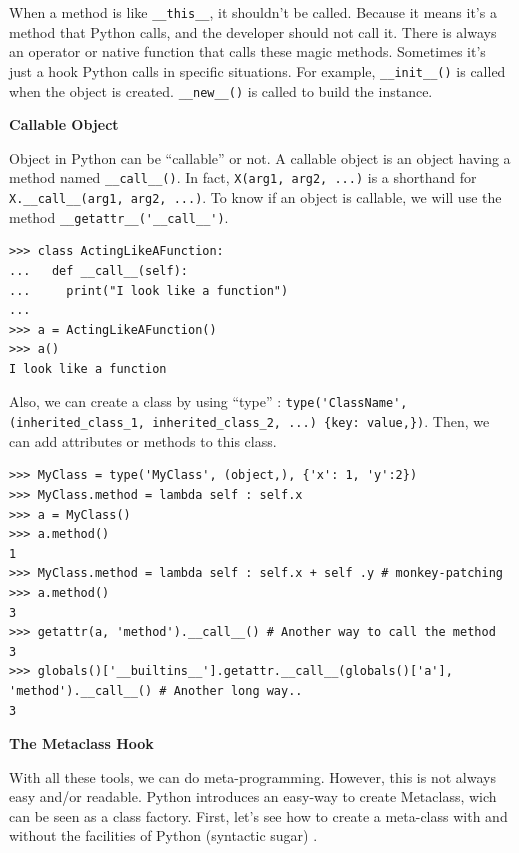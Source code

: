 \documentclass[a4paper,10pt]{article}
\begin{document}
When a method is like \lstinline|__this__|, it shouldn't be called.
Because it means it's a method that Python calls, and the developer should not call it.
There is always an operator or native function that calls these magic methods.
Sometimes it's just a hook Python calls in specific situations.
For example, \lstinline|__init__()| is called when the object is created.
\lstinline|__new__()| is called to build the instance.

\textbf{Callable Object}

Object in Python can be “callable” or not. A callable object is an object having a method named \lstinline|__call__()|. In fact, \lstinline|X(arg1, arg2, ...)| is a shorthand for \mbox{\lstinline|X.__call__(arg1, arg2, ...)|.} To know if an object is callable, we will use the method \lstinline|__getattr__('__call__')|.

\begin{lstlisting}
>>> class ActingLikeAFunction:
...   def __call__(self):
...     print("I look like a function")
...
>>> a = ActingLikeAFunction()
>>> a()
I look like a function
\end{lstlisting}

Also, we can create a class by using ``type'' : \lstinline|type('ClassName', (inherited_class_1, inherited_class_2, ...) {key: value,})|. Then, we can add attributes or methods to this class.

\begin{lstlisting}
>>> MyClass = type('MyClass', (object,), {'x': 1, 'y':2})
>>> MyClass.method = lambda self : self.x
>>> a = MyClass()
>>> a.method()
1
>>> MyClass.method = lambda self : self.x + self .y # monkey-patching
>>> a.method()
3
>>> getattr(a, 'method').__call__() # Another way to call the method
3
>>> globals()['__builtins__'].getattr.__call__(globals()['a'], 'method').__call__() # Another long way..
3
\end{lstlisting}

\textbf{The Metaclass Hook}

With all these tools, we can do meta-programming.
However, this is not always easy and/or readable.
Python introduces an easy-way to create Metaclass, wich can be seen as a class factory.
First, let's see how to create a meta-class with and without the facilities of Python (syntactic sugar) \cite{python:metaclasses}.
\end{document}
